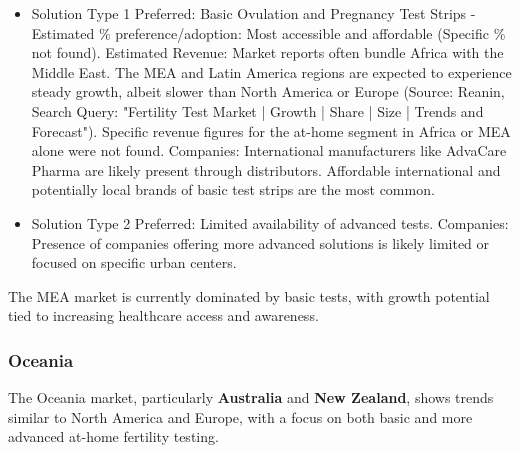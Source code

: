 \documentclass{article}
\begin{document}
\begin{itemize}
  \item Solution Type 1 Preferred: Basic Ovulation and Pregnancy Test Strips - Estimated \% preference/adoption: Most accessible and affordable (Specific \% not found).
    Estimated Revenue: Market reports often bundle Africa with the Middle East. The MEA and Latin America regions are expected to experience steady growth, albeit slower than North America or Europe (Source: Reanin, Search Query: "Fertility Test Market | Growth | Share | Size | Trends and Forecast"). Specific revenue figures for the at-home segment in Africa or MEA alone were not found.
    Companies: International manufacturers like AdvaCare Pharma are likely present through distributors. Affordable international and potentially local brands of basic test strips are the most common.
  \item Solution Type 2 Preferred: Limited availability of advanced tests.
    Companies: Presence of companies offering more advanced solutions is likely limited or focused on specific urban centers.
\end{itemize}
The MEA market is currently dominated by basic tests, with growth potential tied to increasing healthcare access and awareness.

\subsubsection{Oceania}
The Oceania market, particularly \textbf{Australia} and \textbf{New Zealand}, shows trends similar to North America and Europe, with a focus on both basic and more advanced at-home fertility testing.
\end{document}
